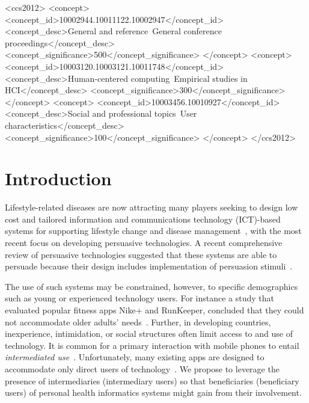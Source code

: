 \documentclass{sig-alternate}
\begin{document}
\begin{CCSXML}
<ccs2012>
<concept>
<concept_id>10002944.10011122.10002947</concept_id>
<concept_desc>General and reference~General conference proceedings</concept_desc>
<concept_significance>500</concept_significance>
</concept>
<concept>
<concept_id>10003120.10003121.10011748</concept_id>
<concept_desc>Human-centered computing~Empirical studies in HCI</concept_desc>
<concept_significance>300</concept_significance>
</concept>
<concept>
<concept_id>10003456.10010927</concept_id>
<concept_desc>Social and professional topics~User characteristics</concept_desc>
<concept_significance>100</concept_significance>
</concept>
</ccs2012>
\end{CCSXML}


%
%
%
%
\printccsdesc



\section{Introduction} 
Lifestyle-related diseases are now attracting many players seeking to design low cost and tailored information and communications technology (ICT)-based systems for supporting lifestyle change and disease management~\cite{arsand:mobile}, with the most recent focus on developing persuasive technologies. A recent comprehensive review of persuasive technologies suggested that these systems are able to persuade because their design includes implementation of persuasion stimuli~\cite{hamari2014persuasive}.

The use of such systems may be constrained, however, to specific demographics such as young or experienced technology users. For instance a study that evaluated popular fitness apps Nike+ and RunKeeper, concluded that they could not accommodate older adults' needs~\cite{silva2014:smartphones}. Further, in developing countries, inexperience, intimidation, or social structures often limit access to and use of technology. It is common for a primary interaction with mobile phones to entail \emph{intermediated use}~\cite{sambasivan2010,kumar2015mobile,katule2016:leveraging}. Unfortunately, many existing apps are designed to accommodate only direct users of technology~\cite{sambasivan2010}. We propose to leverage the presence of intermediaries (intermediary users) so that beneficiaries (beneficiary users) of personal health informatics systems might gain from their involvement.
\end{document}
